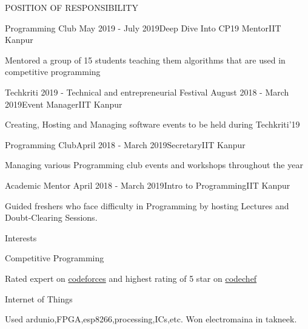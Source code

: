 \documentclass{resume}
\begin{document}
\begin{rSection}{POSITION OF RESPONSIBILITY}

\begin{rSubsection}{ Programming Club }{May 2019 - July 2019}{Deep Dive Into CP19 Mentor}{IIT Kanpur}
\item Mentored a group of 15 students teaching them algorithms that are used in competitive programming
\end{rSubsection}

\begin{rSubsection}{Techkriti 2019 - Technical and entrepreneurial Festival }{August 2018 - March 2019}{Event Manager}{IIT Kanpur}
\item Creating, Hosting and Managing software events to be held during Techkriti'19

\end{rSubsection}


\begin{rSubsection}{Programming Club}{April 2018 - March 2019}{Secretary}{IIT Kanpur}
\item Managing various Programming club events and workshops throughout the year
\end{rSubsection}


\begin{rSubsection}{ Academic Mentor }{April 2018 - March 2019}{Intro to Programming}{IIT Kanpur}
\item Guided freshers who face difficulty in Programming by hosting Lectures and Doubt-Clearing Sessions.
\end{rSubsection}

\end{rSection}

\begin{rSection}{Interests} \itemsep -3pt

\begin{rSubsection}{ Competitive Programming }{}{}{}
\item Rated expert on \href{https://codeforces.com/profile/Mrbinary10}{codeforces} and highest rating of 5 star on \href{https://codechef.com/users/subansal}{codechef}
\end{rSubsection}

\begin{rSubsection}{ Internet of Things }{}{}{}
\item Used ardunio,FPGA,esp8266,processing,ICs,etc. Won electromaina in takneek.
\end{rSubsection}

\end{rSection}
\end{document}

